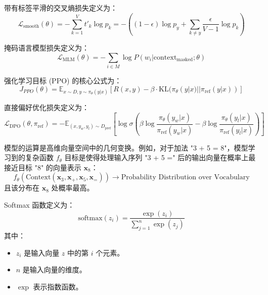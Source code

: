 \documentclass{article}
\begin{document}
带有标签平滑的交叉熵损失定义为：
\[
\mathcal{L}_{\text{smooth}}(\theta) = - \sum_{k=1}^{V} t'_k \log p_k = - \left( (1 - \epsilon) \log p_y + \sum_{k \neq y} \frac{\epsilon}{V-1} \log p_k \right)
\]

掩码语言模型损失定义为：
\[
\mathcal{L}_{\text{MLM}}(\theta) = - \sum_{i \in M} \log P(w_i | \text{context}_{\text{masked}}; \theta)
\]

强化学习目标 (PPO) 的核心公式为：
\[
J_{PPO}(\theta) = \mathbb{E}_{x \sim D, y \sim \pi_{\theta}(y|x)} [ R(x, y) - \beta \cdot \text{KL}(\pi_{\theta}(y|x) || \pi_{\text{ref}}(y|x)) ]
\]

直接偏好优化损失定义为：
\[
\mathcal{L}_{\text{DPO}}(\theta, \pi_{\text{ref}}) = - \mathbb{E}_{(x, y_w, y_l) \sim D_{\text{pref}}} \left[ \log \sigma \left( \beta \log \frac{\pi_{\theta}(y_w|x)}{\pi_{\text{ref}}(y_w|x)} - \beta \log \frac{\pi_{\theta}(y_l|x)}{\pi_{\text{ref}}(y_l|x)} \right) \right]
\]

模型的运算是高维向量空间中的几何变换。例如，对于加法 "3 + 5 = 8"，模型学习到的复杂函数 \( f_{\theta} \) 目标是使得处理输入序列 "3 + 5 =" 后的输出向量在概率上最接近目标 "8" 的向量表示 \( \mathbf{x}_8 \)：
\[
f_{\theta}(\text{Context}(\mathbf{x}_3, \mathbf{x}_{+}, \mathbf{x}_5, \mathbf{x}_{=})) \rightarrow \text{Probability Distribution over Vocabulary}
\]
且该分布在 \( \mathbf{x}_8 \) 处概率最高。


Softmax 函数定义为：
\[
\text{softmax}(z_i) = \frac{\exp(z_i)}{\sum_{j=1}^{n} \exp(z_j)}
\]
其中：
\begin{itemize}
    \item \( z_i \) 是输入向量 \( z \) 中的第 \( i \) 个元素。
    \item \( n \) 是输入向量的维度。
    \item \( \exp \) 表示指数函数。
\end{itemize}
\end{document}
